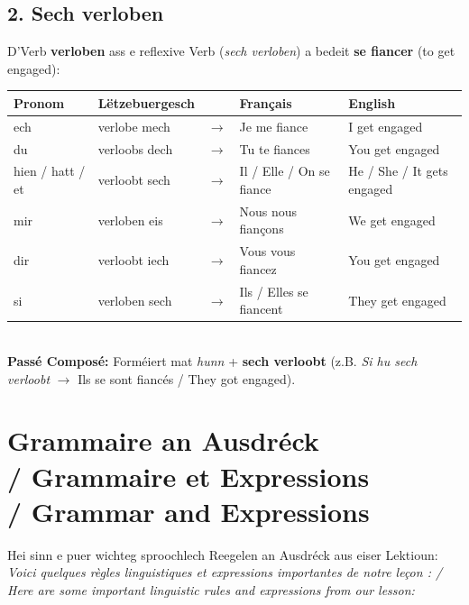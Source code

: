 \subsection*{2. Sech verloben}
D'Verb \textbf{verloben} ass e reflexive Verb (\textit{sech verloben}) a bedeit \textbf{se fiancer} (to get engaged):

\begin{tabular}{ll c l l}
    \toprule
    \textbf{Pronom} & \textbf{Lëtzebuergesch} & \textbf{} & \textbf{Français} & \textbf{English} \\
    \midrule
    ech & verlobe mech & $\rightarrow$ & Je me fiance & I get engaged \\
    du & verloobs dech & $\rightarrow$ & Tu te fiances & You get engaged \\
    hien / hatt / et & verloobt sech & $\rightarrow$ & Il / Elle / On se fiance & He / She / It gets engaged \\
    \midrule
    mir & verloben eis & $\rightarrow$ & Nous nous fiançons & We get engaged \\
    dir & verloobt iech & $\rightarrow$ & Vous vous fiancez & You get engaged \\
    si & verloben sech & $\rightarrow$ & Ils / Elles se fiancent & They get engaged \\
    \bottomrule
\end{tabular}
\\[0.5em]
\textbf{Passé Composé:} Forméiert mat \textit{hunn} + \textbf{sech verloobt} (z.B. \textit{Si hu sech verloobt} $\rightarrow$ Ils se sont fiancés / They got engaged).

\vspace{1cm}

\section[Grammaire an Ausdréck / Grammaire / Grammar]{Grammaire an Ausdréck \\/ Grammaire et Expressions \\/ Grammar and Expressions}

Hei sinn e puer wichteg sproochlech Reegelen an Ausdréck aus eiser Lektioun: \\
\textit{Voici quelques règles linguistiques et expressions importantes de notre leçon : / Here are some important linguistic rules and expressions from our lesson:}

